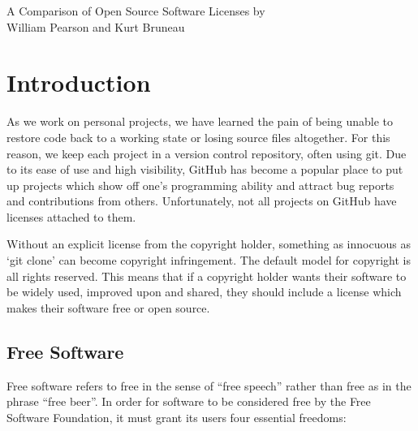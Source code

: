\documentclass[12pt,letterpaper]{article}
\begin{document}
\thispagestyle{empty}

\begin{titlepage}
\vspace*{1.5in}
\begin{center}
  \huge A Comparison of Open Source Software Licenses
  \vskip1.5in
  \large by \\
  \large William Pearson and Kurt Bruneau \\
\end{center}
\end{titlepage}


\tableofcontents
\listoffigures
\newpage

\thispagestyle{empty}
\setcounter{page}{1}

\section{Introduction}

As we work on personal projects, we have learned the pain of being unable to restore code back to a working state or losing source files altogether. For this reason, we keep each project in a version control repository, often using git. Due to its ease of use and high visibility, GitHub has become a popular place to put up projects which show off one's programming ability and attract bug reports and contributions from others. Unfortunately, not all projects on GitHub have licenses attached to them.

Without an explicit license from the copyright holder, something as innocuous as `git clone' can become copyright infringement. The default model for copyright is all rights reserved. This means that if a copyright holder wants their software to be widely used, improved upon and shared, they should include a license which makes their software free or open source.

\subsection{Free Software}

Free software refers to free in the sense of ``free speech'' rather than free as in the phrase ``free beer''. In order for software to be considered free by the Free Software Foundation, it must grant its users four essential freedoms:
\end{document}
